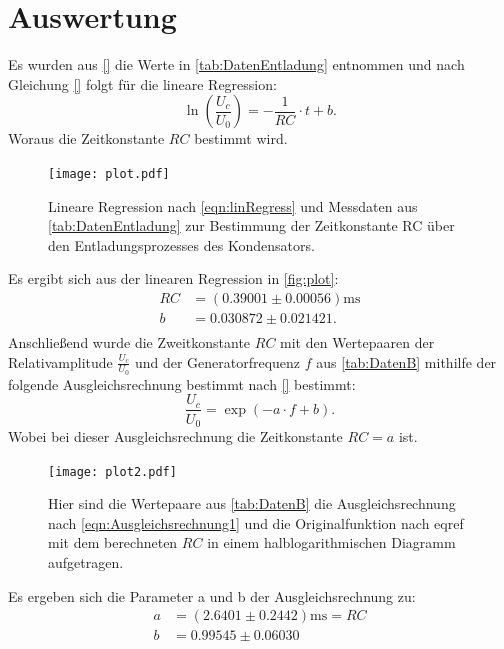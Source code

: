 \section{Auswertung}
\label{sec:Auswertung}
Es wurden aus \autoref{} die Werte in \autoref{tab:DatenEntladung} entnommen und nach Gleichung \eqref{} folgt 
für die lineare Regression:
\begin{equation}
  \label{eqn:linRegress}
    \ln\left(\frac{U_c}{U_0}\right)=-\frac{1}{RC}\cdot t + b.
\end{equation}
Woraus die Zeitkonstante $RC$ bestimmt wird.

\begin{figure}
  \centering
  \texttt{[image: plot.pdf]}
  \caption{Lineare Regression nach \eqref{eqn:linRegress} und Messdaten aus \autoref{tab:DatenEntladung} zur Bestimmung der Zeitkonstante RC über den Entladungsprozesses des Kondensators.}
  \label{fig:plot}
\end{figure}

Es ergibt sich aus der linearen Regression in \autoref{fig:plot}:
\begin{align*}
  RC &= (0.39001\pm 0.00056)\unit{\milli\second}\\
  b &= 0.030872\pm 0.021421.\\
\end{align*}
Anschließend wurde die Zweitkonstante $RC$ mit den Wertepaaren der Relativamplitude $\frac{U_c}{U_0}$ und der Generatorfrequenz $f$
aus \autoref{tab:DatenB} mithilfe der folgende Ausgleichsrechnung bestimmt nach \eqref{} bestimmt:
\begin{equation}
  \label{eqn:Ausgleichsrechnung1}
  \frac{U_c}{U_0} = \exp(-a\cdot f + b).
\end{equation}
Wobei bei dieser Ausgleichsrechnung die Zeitkonstante $RC = a$ ist.
\begin{figure}
  \centering
  \texttt{[image: plot2.pdf]}
  \caption{Hier sind die Wertepaare aus \autoref{tab:DatenB} die Ausgleichsrechnung nach \eqref{eqn:Ausgleichsrechnung1} und die Originalfunktion nach eqref{} mit dem berechneten $RC$ in einem halblogarithmischen Diagramm aufgetragen.}
  \label{fig:plot2}
\end{figure}

Es ergeben sich die Parameter a und b der Ausgleichsrechnung zu:
\begin{align*}
  a &= (2.6401\pm 0.2442) \unit{\milli\second} = RC\\
  b &= 0.99545\pm 0.06030\\
\end{align*}

